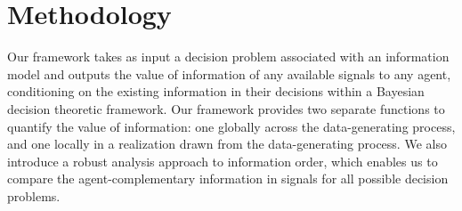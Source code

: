 \mvspace{-3mm}
\section{Methodology}

\mvspace{-2mm}
Our framework takes as input a decision problem associated with an information model and outputs the value of information of any available signals to any agent, conditioning on the existing information in their decisions within a Bayesian decision theoretic framework.
Our framework provides two separate functions to quantify the value of information: one globally across the data-generating process, and one locally in a realization drawn from the data-generating process.
We also introduce a robust analysis approach to information order, which enables us to compare the agent-complementary information in signals for all possible decision problems.


\mvspace{-4mm}
